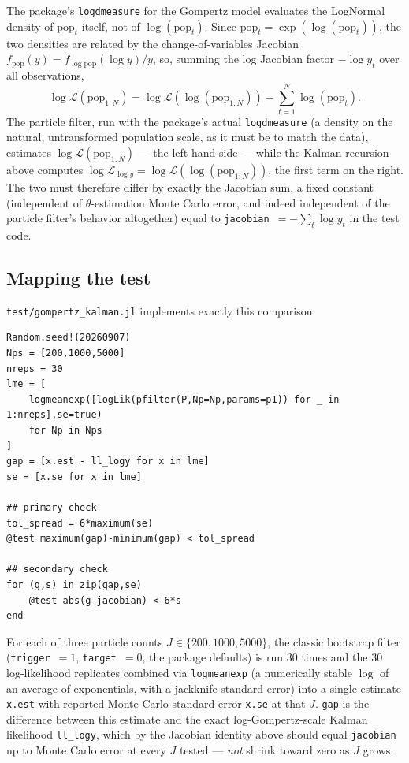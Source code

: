 \documentclass[11pt]{article}
\begin{document}
The package's \texttt{logdmeasure} for the Gompertz model evaluates the
LogNormal density of $\mathrm{pop}_t$ itself, not of $\log(\mathrm{pop}_t)$.
Since $\mathrm{pop}_t = \exp(\log(\mathrm{pop}_t))$, the two densities are
related by the change-of-variables Jacobian
$f_{\mathrm{pop}}(y) = f_{\log\mathrm{pop}}(\log y)/y$, so, summing the log
Jacobian factor $-\log y_t$ over all observations,
\[
\log\mathcal{L}(\mathrm{pop}_{1:N}) = \log\mathcal{L}(\log(\mathrm{pop}_{1:N}))
- \sum_{t=1}^N \log(\mathrm{pop}_t).
\]
The particle filter, run with the package's actual \texttt{logdmeasure} (a
density on the natural, untransformed population scale, as it must be to
match the data), estimates $\log\mathcal{L}(\mathrm{pop}_{1:N})$ — the
left-hand side — while the Kalman recursion above computes
$\log\mathcal{L}_{\log y}=\log\mathcal{L}(\log(\mathrm{pop}_{1:N}))$, the
first term on the right. The two must therefore differ by exactly the
Jacobian sum, a fixed constant (independent of $\theta$-estimation Monte
Carlo error, and indeed independent of the particle filter's behavior
altogether) equal to \texttt{jacobian}~$=-\sum_t \log y_t$ in the test code.

\subsection{Mapping the test}

\texttt{test/gompertz\_kalman.jl} implements exactly this comparison.

\begin{lstlisting}[caption={Two checks against the exact Kalman likelihood (\texttt{test/gompertz\_kalman.jl}, lines 89--117, abridged)}]
Random.seed!(20260907)
Nps = [200,1000,5000]
nreps = 30
lme = [
    logmeanexp([logLik(pfilter(P,Np=Np,params=p1)) for _ in 1:nreps],se=true)
    for Np in Nps
]
gap = [x.est - ll_logy for x in lme]
se = [x.se for x in lme]

## primary check
tol_spread = 6*maximum(se)
@test maximum(gap)-minimum(gap) < tol_spread

## secondary check
for (g,s) in zip(gap,se)
    @test abs(g-jacobian) < 6*s
end
\end{lstlisting}

For each of three particle counts $J\in\{200,1000,5000\}$, the classic
bootstrap filter (\texttt{trigger}~$=1$, \texttt{target}~$=0$, the package
defaults) is run 30 times and the 30 log-likelihood replicates combined via
\texttt{logmeanexp} (a numerically stable $\log$ of an average of
exponentials, with a jackknife standard error) into a single estimate
\texttt{x.est} with reported Monte Carlo standard error \texttt{x.se} at
that $J$. \texttt{gap} is the difference between this estimate and the
exact log-Gompertz-scale Kalman likelihood \texttt{ll\_logy}, which by the
Jacobian identity above should equal \texttt{jacobian} up to Monte Carlo
error at every $J$ tested — \emph{not} shrink toward zero as $J$ grows.
\end{document}
